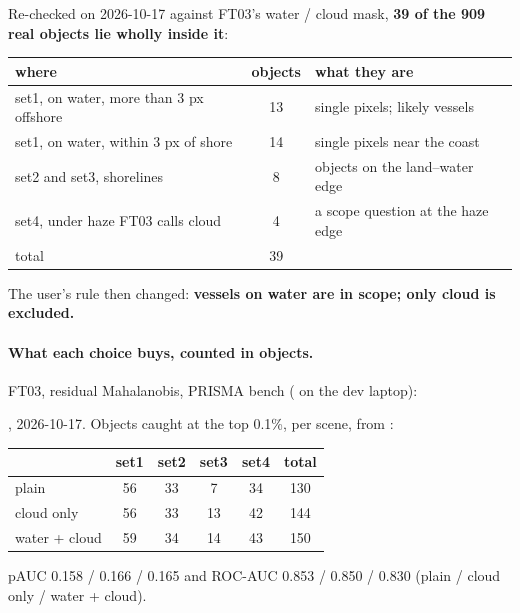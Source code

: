 Re-checked on 2026-10-17 against FT03's water / cloud mask, \textbf{39 of the 909 real objects lie wholly inside
it}\hfil{}\hfilneg{}:

\begin{center}
\small
\begin{tabular}{p{5.8cm}cp{5.2cm}}
\toprule
where & objects & what they are \\
\midrule
set1, on water, more than 3 px offshore & 13 & single pixels; likely vessels \\
set1, on water, within 3 px of shore & 14 & single pixels near the coast \\
set2 and set3, shorelines & 8 & objects on the land--water edge \\
set4, under haze FT03 calls cloud & 4 & a scope question at the haze edge \\
\midrule
total & 39 & \\
\bottomrule
\end{tabular}
\end{center}


The user's rule then changed: \textbf{vessels on water are in scope; only cloud is excluded.}

\paragraph{What each choice buys, counted in objects.} FT03, residual Mahalanobis, PRISMA bench
( on the dev laptop):

\begin{drift}
, 2026-10-17\hfil{}\hfilneg{}.
Objects caught at the top 0.1\%, per scene, from :
\begin{center}
\small
\begin{tabular}{lccccc}
\toprule
 & set1 & set2 & set3 & set4 & total \\
\midrule
plain & 56 & 33 & 7 & 34 & 130 \\
cloud only & 56 & 33 & 13 & 42 & 144 \\
water + cloud & 59 & 34 & 14 & 43 & 150 \\
\bottomrule
\end{tabular}
\end{center}
pAUC 0.158 / 0.166 / 0.165 and ROC-AUC 0.853 / 0.850 / 0.830 (plain / cloud only / water + cloud).
\end{drift}

